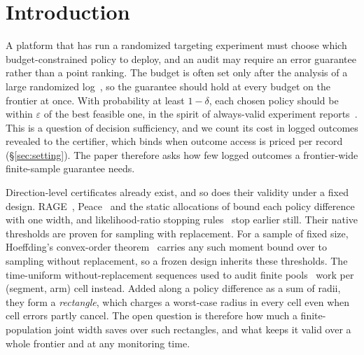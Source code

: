\documentclass[sigconf,anonymous,review]{acmart}
\newcommand{\eps}{\varepsilon}
\begin{document}

\maketitle

\section{Introduction}\label{sec:intro}

A platform that has run a randomized targeting experiment must choose which budget-constrained policy to deploy, and an audit may require an error guarantee rather than a point ranking. The budget is often set only after the analysis of a large randomized log~\citep{diemert2018large}, so the guarantee should hold at every budget on the frontier at once. With probability at least $1-\delta$, each chosen policy should be within $\eps$ of the best feasible one, in the spirit of always-valid experiment reports~\citep{johari2017peeking,howard2021time}. This is a question of decision sufficiency, and we count its cost in logged outcomes revealed to the certifier, which binds when outcome access is priced per record (\S\ref{sec:setting}). The paper therefore asks how few logged outcomes a frontier-wide finite-sample guarantee needs.

Direction-level certificates already exist, and so does their validity under a fixed design. RAGE~\citep{fiez2019sequential}, Peace~\citep{katzsamuels2020empirical} and the static allocations of \citet{soare2014best} bound each policy difference with one width, and likelihood-ratio stopping rules~\citep{garivier2016optimal,jourdan2021efficient} stop earlier still. Their native thresholds are proven for sampling with replacement. For a sample of fixed size, Hoeffding's convex-order theorem~\citep{hoeffding1963probability} carries any such moment bound over to sampling without replacement, so a frozen design inherits these thresholds. The time-uniform without-replacement sequences used to audit finite pools~\citep{waudbysmith2020confidence,waudbysmith2024estimating} work per (segment, arm) cell instead. Added along a policy difference as a sum of radii, they form a \emph{rectangle}, which charges a worst-case radius in every cell even when cell errors partly cancel. The open question is therefore how much a finite-population joint width saves over such rectangles, and what keeps it valid over a whole frontier and at any monitoring time.
\end{document}
